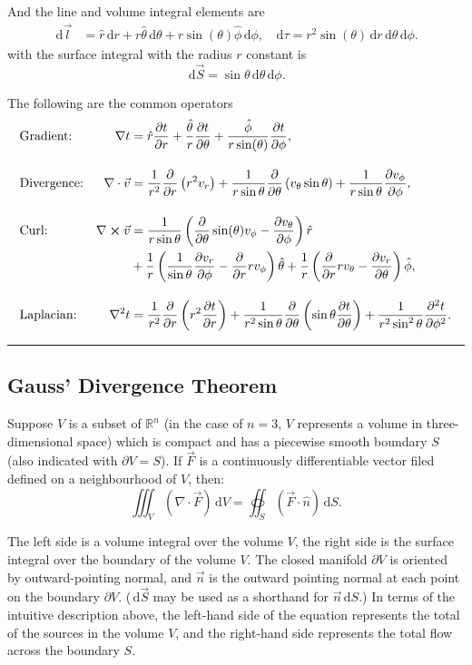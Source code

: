 \documentclass[a4paper]{article}
\newcommand{\dmr}[1]{\, \mathrm{d}#1} %
\numberwithin{equation}{subsection}
\begin{document}
And the line and volume integral elements are
\begin{align*}
    \dmr{\vec{l}} &= \hat{r}\dmr{r} + r\hat{\theta}\dmr{\theta} + r  \sin(\theta) \hat{\phi} \dmr{\phi}, & \dmr{\tau} = r^2 \sin(\theta) \dmr{r} \dmr{\theta} \dmr{\phi}.
\end{align*}
with the surface integral with the radius $r$ constant is
\[
    \dmr{\vec{S}} = \sin\theta \dmr{\theta} \dmr{\phi}.
\]

The following are the common operators
\begin{align*}
    &\text{Gradient:} &\nabla t  &= \hat{r}\pdv{t}{r} + \frac{\hat{\theta}}{r}\pdv{t}{\theta} + \frac{\hat{\phi}}{r \sin(\theta)}\pdv{t}{\phi},\\[1em]
    &\text{Divergence:} &\nabla\cdot\vec{v} &= \frac{1}{r^{2}} \frac{\partial}{\partial r}\left(r^{2} v_r \right)+\frac{1}{r \sin \theta} \frac{\partial}{\partial \theta}\left(v_{\theta} \sin \theta\right)+\frac{1}{r \sin \theta} \frac{\partial v_{\phi}}{\partial \phi},\\[1em]
    &\text{Curl:} &\nabla \cross \vec{v} &= \frac{1}{r\sin\theta}\left(\pdv{}{\theta}\sin(\theta) v_\phi- \pdv{v_\theta}{\phi}\right)\hat{r}\\
    &&&+\frac{1}{r}\left(\frac{1}{\sin\theta}\pdv{v_r}{\phi}-\pdv{}{r}  r v_\phi  \right)\hat{\theta}+ \frac{1}{r}\left(\pdv{}{r}rv_\theta-\pdv{v_r}{\theta}\right)\hat{\phi},\\[1em]
    &\text{Laplacian:} &\laplacian t &= \frac{1}{r^2}\pdv{}{r}\left(r^2\pdv{t}{r}\right)+ \frac{1}{r^2\sin\theta}\pdv{}{\theta}\left(\sin\theta\pdv{t}{\theta}\right) +\frac{1}{r^2 \sin^2 \theta}\pdv[2]{t}{\phi}.
\end{align*}

\par\noindent\rule{\textwidth}{0.4pt}

\subsection{Gauss' Divergence Theorem}
Suppose $V$ is a subset of $\mathbb{R}^n$ (in the case of $n=3$, $V$ represents a volume in three-dimensional space) which is compact and has a piecewise smooth boundary $S$ (also indicated with $\partial V = S$). If $\vec{F}$ is a continuously differentiable vector filed defined on a neighbourhood of $V$, then:
\[
    \iiint_{V} \left(\nabla \cdot \vec{F}\right)\dmr{V} = \oiint_{S} \left(\vec{F}\cdot\hat{n}\right)\dmr{S}.
\]
\par The left side is a volume integral over the volume $V$, the right side is the surface integral over the boundary of the volume $V$. The closed manifold $\partial V$ is oriented by outward-pointing normal, and $\vec{n}$ is the outward pointing normal at each point on the boundary $\partial V$. ($\dmr{\vec{S}}$ may be used as a shorthand for $\vec{n}\dmr{S}$.) In terms of the intuitive description above, the left-hand side of the equation represents the total of the sources in the volume $V$, and the right-hand side represents the total flow across the boundary $S$.\cite{noauthor_divergence_2021}
\end{document}
